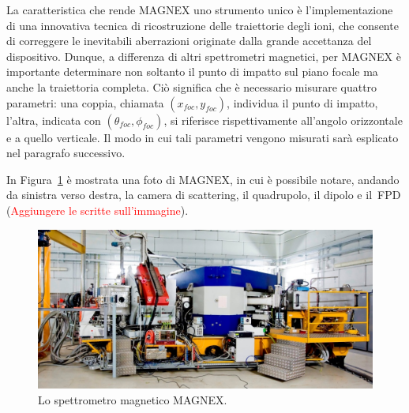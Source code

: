 La caratteristica che rende MAGNEX uno strumento unico è l'implementazione di una innovativa tecnica di ricostruzione delle traiettorie degli ioni, che consente di correggere le inevitabili aberrazioni originate dalla grande accettanza del dispositivo.
Dunque, a differenza di altri spettrometri magnetici, per MAGNEX è importante determinare non soltanto il punto di impatto sul piano focale ma anche la traiettoria completa. Ciò significa che è necessario misurare quattro parametri: una coppia, chiamata $(x_{foc}, y_{foc})$, individua il punto di impatto, l'altra, indicata con $(\theta_{foc}, \phi_{foc})$, si riferisce rispettivamente all'angolo orizzontale e a quello verticale.
Il modo in cui tali parametri vengono misurati sarà esplicato nel paragrafo successivo.

In Figura~\ref{fig:magnex} è mostrata una foto di MAGNEX, in cui è possibile notare, andando da sinistra verso destra, la camera di scattering, il quadrupolo, il dipolo e il~FPD (\textcolor{red}{Aggiungere le scritte sull'immagine}).

\begin{figure} [!t]
	\centering
	\includegraphics[width=\textwidth, keepaspectratio]{Grafici/magnex.jpg}
	\caption{Lo spettrometro magnetico MAGNEX.} \label{fig:magnex}
\end{figure}




\subsection{} \label{sez:fpd}

